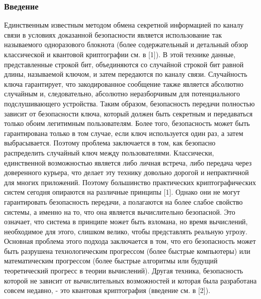 \subsubsection{Введение}
Единственным известным методом обмена секретной информацией по каналу связи в условиях доказанной безопасности является использование так называемого одноразового блокнота (более содержательный и детальный обзор классической и квантовой криптографии см. в [1]). В этой технике данные, представленные строкой бит, объединяются со случайной строкой бит равной длины, называемой ключом, и затем передаются по каналу связи. Случайность ключа гарантирует, что закодированное сообщение также является абсолютно случайным и, следовательно, абсолютно неразборчивым для потенциального подслушивающего устройства. Таким образом, безопасность передачи полностью зависит от безопасности ключа, который должен быть секретным и передаваться только обоим легитимным пользователям. Более того, безопасность может быть гарантирована только в том случае, если ключ используется один раз, а затем выбрасывается. Поэтому проблема заключается в том, как безопасно распределить случайный ключ между пользователями. Классически, единственной возможностью является либо личная встреча, либо передача через доверенного курьера, что делает эту технику довольно дорогой и непрактичной для многих приложений. Поэтому большинство практических криптографических систем сегодня опираются на различные принципы [1]. Однако они не могут гарантировать безопасность передачи, а полагаются на более слабое свойство системы, а именно на то, что она является вычислительно безопасной. Это означает, что система в принципе может быть взломана, но время вычислений, необходимое для этого, слишком велико, чтобы представлять реальную угрозу. Основная проблема этого подхода заключается в том, что его безопасность может быть разрушена технологическим прогрессом (более быстрые компьютеры) или математическим прогрессом (более быстрые алгоритмы или будущий теоретический прогресс в теории вычислений). Другая техника, безопасность которой не зависит от вычислительных возможностей и которая была разработана совсем недавно, - это квантовая криптография (введение см. в [2]).

